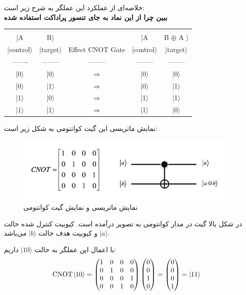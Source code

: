 \documentclass{book}
\begin{document}
خلاصه‌ای از عملکرد این عملگر به شرح زیر است:\\
\textbf{ببین چرا از این نماد به جای تنسور پراداکت استفاده شده}
\begin{latin}
\begin{tabular}{ccccc}
	&&&&\\
	|A & B$\rangle$ &	&  |A &B $\oplus$ A $\rangle$  \\
	|control$\rangle$ & |target$\rangle$ & Effect CNOT Gate &|control$\rangle$ & |target$\rangle$ \\
	------- & -------- & -------- & -------- & --------  \\
	|0$\rangle$ & |0$\rangle$ & $\Longrightarrow$ &|0$\rangle$ & |0$\rangle$ \\
	|0$\rangle$ & |1$\rangle$ & $\Longrightarrow$ &|0$\rangle$ & |1$\rangle$ \\
	|1$\rangle$ & |0$\rangle$ & $\Longrightarrow$ &|1$\rangle$ & |1$\rangle$ \\
	|1$\rangle$ & |1$\rangle$ & $\Longrightarrow$ &|1$\rangle$ & |0$\rangle$
\end{tabular}
\end{latin}


نمایش ماتریسی این گیت کوانتومی به شکل زیر است:
\begin{figure}[ht]
	\centering
	\includegraphics[width=\linewidth]{Matrix-representation-and-quantum-circuit-of-CNOT-gate.png}
	\caption{نمایش ماتریسی و نمایش گیت کوانتومی }
	\label{CNOT}
\end{figure}


در شکل بالا گیت  در مدار کوانتومی به تصویر درآمده است. کیوبیت کنترل شده  حالت $\vert a \rangle$ و کیوبیت هدف حالت $\vert b \rangle$ می‌باشد.


با اعمال این عملگر به حالت $\vert 10\rangle$ داریم:
$$
\text{CNOT} \ket{10} = \begin{pmatrix}
	1 & 0 & 0 & 0 \\
	0 & 1 & 0 & 0 \\
	0 & 0 & 0 & 1 \\
	0 & 0 & 1 & 0
\end{pmatrix} \begin{pmatrix}
	0 \\
	0 \\
	1 \\
	0
\end{pmatrix} = \begin{pmatrix}
	0 \\
	0 \\
	0 \\
	1
\end{pmatrix} = \ket{11}
$$\\
\end{document}
